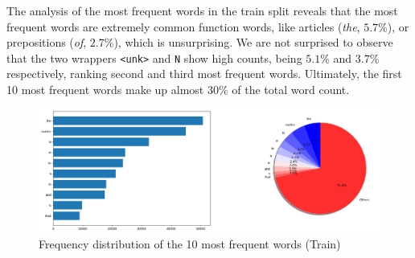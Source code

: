 The analysis of the most frequent words in the train split reveals that the most frequent words are extremely common function words, like articles (\textit{the}, \(5.7\)\%), or prepositions (\textit{of}, \(2.7\)\%), which is unsurprising. We are not surprised to observe that the two wrappers \texttt{<unk>} and \texttt{N} show high counts, being \(5.1\)\% and \(3.7\)\% respectively, ranking second and third most frequent words. Ultimately, the first 10 most frequent words make up almost 30\% of the total word count.

\begin{figure}[!t]
    \centering
    \includegraphics[keepaspectratio,width=.5\textwidth]{assets/images/train_freq.png}
    \caption{Frequency distribution of the 10 most frequent words (Train)} 
    \label{fig:train_freq}
\end{figure}

